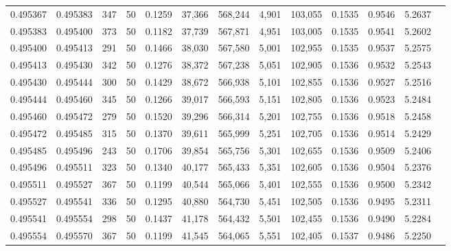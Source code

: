 \begin{tabular}{rrrrrrrrrrrrr}
0.495367 & 0.495383 & 347 &  50 &                                     0.1259 &  37,366 & 568,244 &   4,901 & 103,055 & 0.1535 & 0.9546 & 5.2637 \\
0.495383 & 0.495400 & 373 &  50 &                                     0.1182 &  37,739 & 567,871 &   4,951 & 103,005 & 0.1535 & 0.9541 & 5.2602 \\
0.495400 & 0.495413 & 291 &  50 &                                     0.1466 &  38,030 & 567,580 &   5,001 & 102,955 & 0.1535 & 0.9537 & 5.2575 \\
0.495413 & 0.495430 & 342 &  50 &                                     0.1276 &  38,372 & 567,238 &   5,051 & 102,905 & 0.1536 & 0.9532 & 5.2543 \\
0.495430 & 0.495444 & 300 &  50 &                                     0.1429 &  38,672 & 566,938 &   5,101 & 102,855 & 0.1536 & 0.9527 & 5.2516 \\
0.495444 & 0.495460 & 345 &  50 &                                     0.1266 &  39,017 & 566,593 &   5,151 & 102,805 & 0.1536 & 0.9523 & 5.2484 \\
0.495460 & 0.495472 & 279 &  50 &                                     0.1520 &  39,296 & 566,314 &   5,201 & 102,755 & 0.1536 & 0.9518 & 5.2458 \\
0.495472 & 0.495485 & 315 &  50 &                                     0.1370 &  39,611 & 565,999 &   5,251 & 102,705 & 0.1536 & 0.9514 & 5.2429 \\
0.495485 & 0.495496 & 243 &  50 &                                     0.1706 &  39,854 & 565,756 &   5,301 & 102,655 & 0.1536 & 0.9509 & 5.2406 \\
0.495496 & 0.495511 & 323 &  50 &                                     0.1340 &  40,177 & 565,433 &   5,351 & 102,605 & 0.1536 & 0.9504 & 5.2376 \\
0.495511 & 0.495527 & 367 &  50 &                                     0.1199 &  40,544 & 565,066 &   5,401 & 102,555 & 0.1536 & 0.9500 & 5.2342 \\
0.495527 & 0.495541 & 336 &  50 &                                     0.1295 &  40,880 & 564,730 &   5,451 & 102,505 & 0.1536 & 0.9495 & 5.2311 \\
0.495541 & 0.495554 & 298 &  50 &                                     0.1437 &  41,178 & 564,432 &   5,501 & 102,455 & 0.1536 & 0.9490 & 5.2284 \\
0.495554 & 0.495570 & 367 &  50 &                                     0.1199 &  41,545 & 564,065 &   5,551 & 102,405 & 0.1537 & 0.9486 & 5.2250 \\

\end{tabular}
